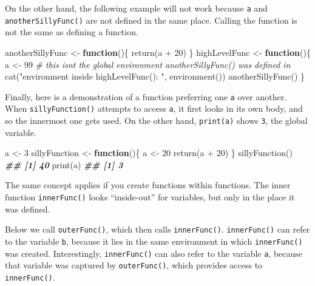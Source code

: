 \documentclass[
  12pt,
  krantz2]{krantz}
\makeatletter
\newenvironment{Shaded}{\begin{snugshade}}{\end{snugshade}}
\newcommand{\CommentTok}[1]{\textcolor[rgb]{0.37,0.37,0.37}{\textit{#1}}}
\newcommand{\ControlFlowTok}[1]{\textcolor[rgb]{0.27,0.27,0.27}{\textbf{#1}}}
\newcommand{\DecValTok}[1]{\textcolor[rgb]{0.06,0.06,0.06}{#1}}
\newcommand{\DocumentationTok}[1]{\textcolor[rgb]{0.37,0.37,0.37}{\textbf{\textit{#1}}}}
\newcommand{\FunctionTok}[1]{\textcolor[rgb]{0,0,0}{#1}}
\newcommand{\NormalTok}[1]{#1}
\newcommand{\OtherTok}[1]{\textcolor[rgb]{0.37,0.37,0.37}{#1}}
\newcommand{\SpecialCharTok}[1]{\textcolor[rgb]{0,0,0}{#1}}
\newcommand{\StringTok}[1]{\textcolor[rgb]{0.5,0.5,0.5}{#1}}
\newenvironment{kframe}{%
\medskip{}
\setlength{\fboxsep}{.8em}
 \def\at@end@of@kframe{}%
 \ifinner\ifhmode%
  \def\at@end@of@kframe{\end{minipage}}%
  \begin{minipage}{\columnwidth}%
 \fi\fi%
 \def\FrameCommand##1{\hskip\@totalleftmargin \hskip-\fboxsep
 \colorbox{shadecolor}{##1}\hskip-\fboxsep
     \hskip-\linewidth \hskip-\@totalleftmargin \hskip\columnwidth}%
 \MakeFramed {\advance\hsize-\width
   \@totalleftmargin\z@ \linewidth\hsize
   \@setminipage}}%
 {\par\unskip\endMakeFramed%
 \at@end@of@kframe}
\renewenvironment{Shaded}{\begin{kframe}}{\end{kframe}}
\makeatother
\begin{document}
On the other hand, the following example will not work because \texttt{a} and \texttt{anotherSillyFunc()} are not defined in the same place. Calling the function is not the same as defining a function.

\begin{Shaded}
\begin{Highlighting}[]
\NormalTok{anotherSillyFunc }\OtherTok{\textless{}{-}} \ControlFlowTok{function}\NormalTok{()\{}
  \FunctionTok{return}\NormalTok{(a }\SpecialCharTok{+} \DecValTok{20}\NormalTok{) }
\NormalTok{\}}
\NormalTok{highLevelFunc }\OtherTok{\textless{}{-}} \ControlFlowTok{function}\NormalTok{()\{}
\NormalTok{  a }\OtherTok{\textless{}{-}} \DecValTok{99}
  \CommentTok{\# this isn\textquotesingle{}t the global environment anotherSillyFunc() was defined in}
  \FunctionTok{cat}\NormalTok{(}\StringTok{"environment inside highLevelFunc(): "}\NormalTok{, }\FunctionTok{environment}\NormalTok{())}
  \FunctionTok{anotherSillyFunc}\NormalTok{()}
\NormalTok{\}}
\end{Highlighting}
\end{Shaded}

Finally, here is a demonstration of a function preferring one \texttt{a} over another. When \texttt{sillyFunction()} attempts to access \texttt{a}, it first looks in its own body, and so the innermost one gets used. On the other hand, \texttt{print(a)} shows \texttt{3}, the global variable.

\begin{Shaded}
\begin{Highlighting}[]
\NormalTok{a }\OtherTok{\textless{}{-}} \DecValTok{3}
\NormalTok{sillyFunction }\OtherTok{\textless{}{-}} \ControlFlowTok{function}\NormalTok{()\{}
\NormalTok{  a }\OtherTok{\textless{}{-}} \DecValTok{20}
  \FunctionTok{return}\NormalTok{(a }\SpecialCharTok{+} \DecValTok{20}\NormalTok{) }
\NormalTok{\}}
\FunctionTok{sillyFunction}\NormalTok{()}
\DocumentationTok{\#\# [1] 40}
\FunctionTok{print}\NormalTok{(a)}
\DocumentationTok{\#\# [1] 3}
\end{Highlighting}
\end{Shaded}

The same concept applies if you create functions within functions. The inner function \texttt{innerFunc()} looks ``inside-out'' for variables, but only in the place it was defined.

Below we call \texttt{outerFunc()}, which then calls \texttt{innerFunc()}. \texttt{innerFunc()} can refer to the variable \texttt{b}, because it lies in the same environment in which \texttt{innerFunc()} was created. Interestingly, \texttt{innerFunc()} can also refer to the variable \texttt{a}, because that variable was captured by \texttt{outerFunc()}, which provides access to \texttt{innerFunc()}.
\end{document}

